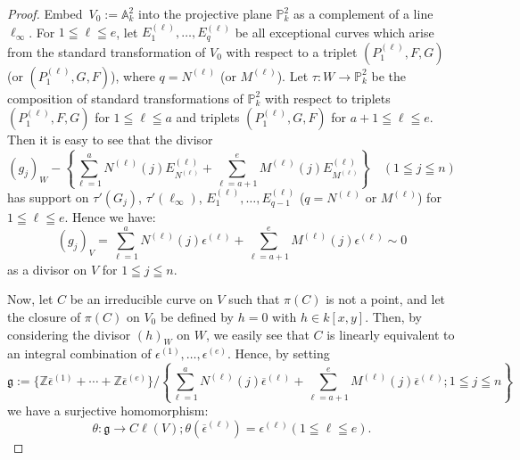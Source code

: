 \begin{proof}
Embed\pageoriginale\ $V_{0}:=\mathbb{A}^{2}_{k}$ into the projective
plane $\mathbb{P}^{2}_{k}$ as a complement of a line
$\ell_{\infty}$. For $1\leqq \ell \leqq e$, let
$E^{(\ell)}_{1},\ldots,E^{(\ell)}_{q}$ be all exceptional curves which
arise from the standard transformation of $V_{0}$ with respect to a
triplet $(P^{(\ell)}_{1},F,G)$ (or $(P^{(\ell)}_{1},G,F)$), where
$q=N^{(\ell)}$ (or $M^{(\ell)}$). Let $\tau:W\to \mathbb{P}^{2}_{k}$
be the composition of standard transformations of $\mathbb{P}^{2}_{k}$
with respect to triplets $(P^{(\ell)}_{1},F,G)$ for $1\leqq \ell\leqq
a$ and triplets $(P^{(\ell)}_{1},G,F)$ for $a+1\leqq \ell\leqq
e$. Then it is easy to see that the divisor
$$
(g_{j})_{W}-\left\{\sum^{a}_{\ell=1}N^{(\ell)}(j)E^{(\ell)}_{N^{(\ell)}}+\sum^{e}_{\ell=a+1}M^{(\ell)}(j)E^{(\ell)}_{M^{(\ell)}}\right\}\quad
(1\leqq j\leqq n) 
$$
has support on $\tau'(G_{j})$, $\tau'(\ell_{\infty})$,
$E^{(\ell)}_{1},\ldots,E^{(\ell)}_{q-1}$ ($q=N^{(\ell)}$ or
$M^{(\ell)}$) for $1\leqq \ell\leqq e$. Hence we have:
$$
(g_{j})_{V}=\sum^{a}_{\ell=1}N^{(\ell)}(j)\epsilon^{(\ell)}+\sum^{e}_{\ell=a+1}M^{(\ell)}(j)\epsilon^{(\ell)}\sim
0 
$$
as a divisor on $V$ for $1\leqq j\leqq n$.

Now, let $C$ be an irreducible curve on $V$ such that $\pi(C)$ is not
a point, and let the closure of $\pi(C)$ on $V_{0}$ be defined by
$h=0$ with $h\in k[x,y]$. Then, by considering the divisor $(h)_{W}$
on $W$, we easily see that $C$ is linearly equivalent to an integral
combination of $\epsilon^{(1)},\ldots,\epsilon^{(e)}$. Hence, by
setting
$$
\mathfrak{g}:=\{\mathbb{Z}\overline{\epsilon}^{(1)}+\cdots+\mathbb{Z}\overline{\epsilon}^{(e)}\}/\left\{\sum^{a}_{\ell=1}N^{(\ell)}(j)\overline{\epsilon}^{(\ell)}+\sum^{e}_{\ell=a+1}M^{(\ell)}(j)\overline{\epsilon}^{(\ell)};1\leqq
j\leqq n\right\}
$$
we have a surjective homomorphism:
$$
\theta:\mathfrak{g}\to C\ell(V);
\theta(\overline{\epsilon}^{(\ell)})=\epsilon^{(\ell)}(1\leqq
\ell\leqq e). 
$$


\end{proof}
